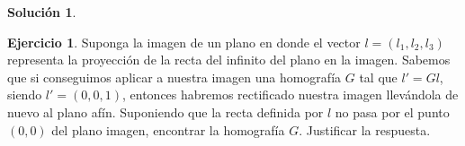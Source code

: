 \documentclass[a4paper, 11pt]{article}
\theoremstyle{definition}
\newtheorem{ejercicio}{Ejercicio}
\newtheorem*{solucion}{Solución}
\theoremstyle{theorem}
\begin{document}
  \begin{solucion}
  \end{solucion}

  \begin{ejercicio}
      Suponga la imagen de un plano en donde el vector $l=(l_1,l_2,l_3)$ representa la proyección de la recta del infinito del plano en la imagen. Sabemos que si conseguimos aplicar a nuestra imagen una homografía $G$ tal que $l'= Gl$, siendo $l' =(0,0,1)$, entonces habremos rectificado nuestra imagen llevándola de nuevo al plano afín. Suponiendo que la recta definida por $l$ no pasa por el punto $(0,0)$ del plano imagen, encontrar la homografía $G$. Justificar la respuesta.
  \end{ejercicio}
\end{document}
